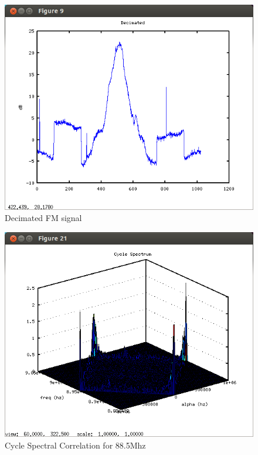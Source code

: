 \begin{figure}
\centering
\includegraphics[width=\linewidth]{../img/Report_Decimated_FM_and_Digital.png}
\caption{Decimated FM signal}
\label{fig:decimatedFMandDig}

\end{figure}

\begin{figure}
\centering
\includegraphics[width=\linewidth]{../img/Report_Cycle_Spectral_Corr_88_5}
\caption{Cycle Spectral Correlation for 88.5Mhz}
\label{fig:cycleSpec885}

\end{figure}

